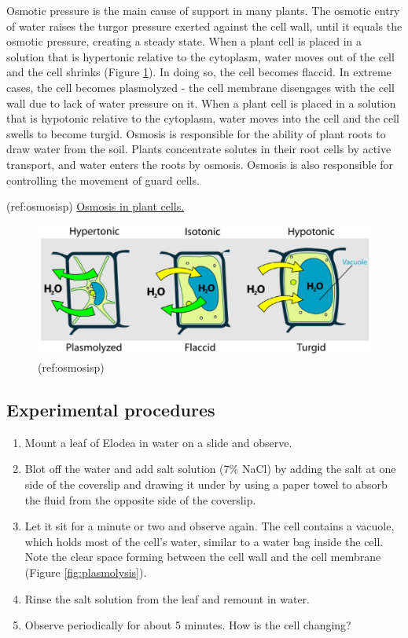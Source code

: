 Osmotic pressure is the main cause of support in many plants. The
osmotic entry of water raises the turgor pressure exerted against the
cell wall, until it equals the osmotic pressure, creating a steady
state. When a plant cell is placed in a solution that is hypertonic
relative to the cytoplasm, water moves out of the cell and the cell
shrinks (Figure \ref{fig:osmosisp}). In doing so, the cell becomes
flaccid. In extreme cases, the cell becomes plasmolyzed - the cell
membrane disengages with the cell wall due to lack of water pressure on
it. When a plant cell is placed in a solution that is hypotonic relative
to the cytoplasm, water moves into the cell and the cell swells to
become turgid. Osmosis is responsible for the ability of plant roots to
draw water from the soil. Plants concentrate solutes in their root cells
by active transport, and water enters the roots by osmosis. Osmosis is
also responsible for controlling the movement of guard cells.

(ref:osmosisp)
\href{https://commons.wikimedia.org/wiki/File:Turgor_pressure_on_plant_cells_diagram.svg}{Osmosis
in plant cells.}

\begin{figure}

{\centering \includegraphics[width=0.7\linewidth]{./figures/exchange/Osmosis_plant} 

}

\caption{(ref:osmosisp)}\label{fig:osmosisp}
\end{figure}

\subsection{Experimental procedures}\label{experimental-procedures-19}

\begin{enumerate}
\def\labelenumi{\arabic{enumi}.}
\tightlist
\item
  Mount a leaf of Elodea in water on a slide and observe.
\item
  Blot off the water and add salt solution (7\% NaCl) by adding the salt
  at one side of the coverslip and drawing it under by using a paper
  towel to absorb the fluid from the opposite side of the coverslip.
\item
  Let it sit for a minute or two and observe again. The cell contains a
  vacuole, which holds most of the cell's water, similar to a water bag
  inside the cell. Note the clear space forming between the cell wall
  and the cell membrane (Figure \ref{fig:plasmolysis}).
\item
  Rinse the salt solution from the leaf and remount in water.
\item
  Observe periodically for about 5 minutes. How is the cell changing?
\end{enumerate}

